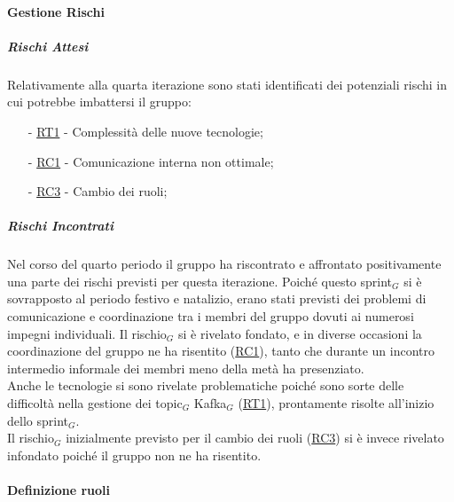 \documentclass[10pt]{article}
\begin{document}
{{{{{    \paragraph{Gestione Rischi}\mbox{}
    \vspace{-1em}
    \subparagraph*{Rischi Attesi}\mbox{}
    Relativamente alla quarta iterazione sono stati identificati dei potenziali rischi in cui potrebbe imbattersi il gruppo:
    \vspace{-0.5em}
    \begin{itemize}
    \setlength\itemsep{-0.2em}
    \item [-] \hyperref[RT1]{RT1} - Complessità delle nuove tecnologie;
    \item [-] \hyperref[RC1]{RC1} - Comunicazione interna non ottimale;
    \item [-] \hyperref[RC3]{RC3} - Cambio dei ruoli;
    \end{itemize}

    \subparagraph*{Rischi Incontrati}\mbox{}

    Nel corso del quarto periodo il gruppo ha riscontrato e affrontato positivamente una parte dei rischi previsti per questa iterazione.
    Poiché questo sprint$_G$ si è sovrapposto al periodo festivo e natalizio, erano stati previsti dei problemi di comunicazione e coordinazione
    tra i membri del gruppo dovuti ai numerosi impegni individuali. Il rischio$_G$ si è rivelato fondato, e in diverse occasioni
    la coordinazione del gruppo ne ha risentito (\hyperref[RC1]{RC1}), tanto che durante un incontro intermedio informale dei membri 
    meno della metà ha presenziato.\\
    Anche le tecnologie si sono rivelate problematiche poiché sono sorte delle difficoltà nella gestione dei topic$_G$ Kafka$_G$ (\hyperref[RT1]{RT1}), 
    prontamente risolte all'inizio dello sprint$_G$.\\
    Il rischio$_G$ inizialmente previsto per il cambio dei ruoli (\hyperref[RC3]{RC3}) si è invece rivelato infondato poiché il gruppo non ne ha risentito.
    
    \paragraph{Definizione ruoli}\mbox{}\vspace{0.4em}
    
}}}}}
\end{document}
